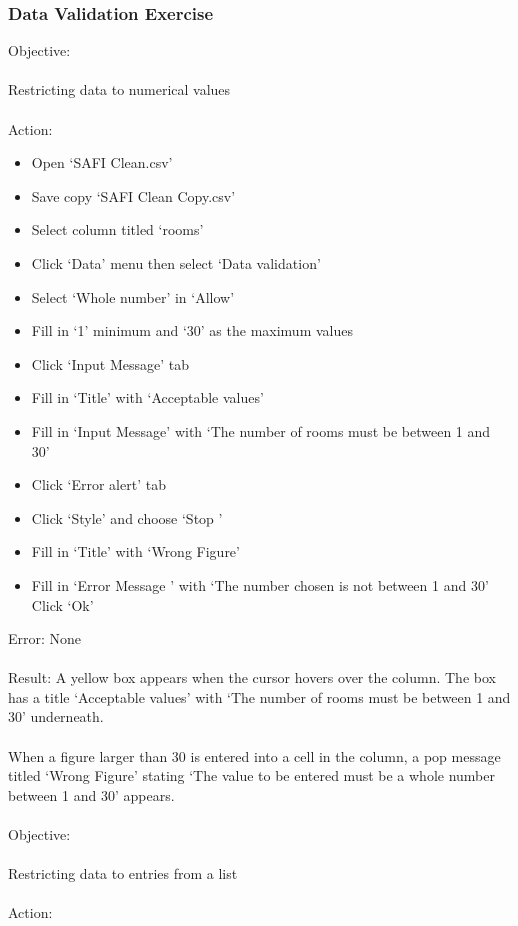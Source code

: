 \documentclass{article}
\begin{document}
\subsubsection*{Data Validation Exercise}
Objective:\\\\
Restricting data to numerical values\\\\
Action:
\begin{itemize}
\item Open ‘SAFI Clean.csv’
\item Save copy ‘SAFI Clean Copy.csv’
\item Select column titled ‘rooms’
\item Click ‘Data’ menu then select ‘Data validation’
\item Select ‘Whole number’ in ‘Allow’
\item Fill in ‘1’ minimum and ‘30’ as the maximum values
\item Click ‘Input Message’ tab
\item Fill in ‘Title’ with ‘Acceptable values’
\item Fill in ‘Input Message’ with ‘The number of rooms must be between 1 and 30’
\item Click ‘Error alert’ tab
\item Click ‘Style’ and choose ‘Stop ’
\item Fill in ‘Title’ with ‘Wrong Figure’
\item Fill in ‘Error Message ’ with ‘The number chosen is not between 1 and 30’
Click ‘Ok’
\end{itemize}
Error: None\\\\
Result: A yellow box appears when the cursor hovers over the column. The box has a title ‘Acceptable values’ with ‘The number of rooms must be between 1 and 30’ underneath.\\\\
When a figure larger than 30 is entered into a cell in the column, a pop message titled ‘Wrong Figure’ stating ‘The value to be entered must be a whole number between 1 and 30’ appears.\\\\
Objective:\\\\
Restricting data to entries from a list\\\\
Action:
\end{document}
